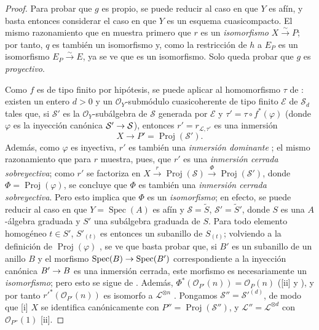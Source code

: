 \documentclass[oneside,10pt]{amsart}
\makeatletter
\newcommand{\ega@arrow}[2]{\mathchoice{#1}{#2}{#2}{#2}}
\renewcommand{\to}{\ega@arrow{\longrightarrow}{\rightarrow}}
\newcommand{\oldpage}[2][]{\marginnote{\normalfont\footnotesize\textbf{#1}~|~#2}\ignorespaces}
\makeatother
\begin{document}
\begin{proof}
Para probar que $g$ es propio, se puede reducir al caso en que $Y$ es afín, y basta entonces considerar el caso en que $Y$ es un esquema cuasicompacto.
El mismo razonamiento que en  muestra primero que $r$ es un \emph{isomorfismo} $X\xrightarrow{\sim}P$;
por tanto, $q$ es también un isomorfismo y, como la restricción de $h$ a $E_P$ es un isomorfismo $E_P\xrightarrow{\sim}E$, ya se ve que  es un isomorfismo.
Solo queda probar que $g$ es \emph{proyectivo}.

Como $f$ es de tipo finito por hipótesis, se puede aplicar  al homomorfismo
\oldpage[II]{180}
$\tau$ de :
existen un entero $d>0$ y un $\mathcal{O}_Y$-submódulo cuasicoherente de tipo finito $\mathcal{E}$ de $\mathcal{S}_d$ tales que, si $\mathcal{S}'$ es la $\mathcal{O}_Y$-subálgebra de $\mathcal{S}$ generada por $\mathcal{E}$ y $\tau'=\tau\circ f^*(\varphi)$ (donde $\varphi$ es la inyección canónica $\mathcal{S}'\to\mathcal{S}$), entonces $r'=r_{\mathcal{L},\tau'}$ es una inmersión
\[
  X\longrightarrow P'=\operatorname{Proj}(\mathcal{S}').
\]
Además, como $\varphi$ es inyectiva, $r'$ es también una \emph{inmersión dominante} ;
el mismo razonamiento que para $r$ muestra, pues, que $r'$ es una \emph{inmersión cerrada sobreyectiva};
como $r'$ se factoriza en $X\xrightarrow{r}\operatorname{Proj}(\mathcal{S})
\xrightarrow{\Phi}\operatorname{Proj}(\mathcal{S}')$, donde $\Phi=\operatorname{Proj}(\varphi)$, se concluye que $\Phi$ es también una \emph{inmersión cerrada sobreyectiva}.
Pero esto implica que $\Phi$ es un \emph{isomorfismo};
en efecto, se puede reducir al caso en que $Y=\operatorname{Spec}(A)$ es afín y $\mathcal{S}=\widetilde{S}$, $\mathcal{S}'=\widetilde{S}'$, donde $S$ es una $A$-álgebra graduada y $S'$ una subálgebra graduada de $S$.
Para todo elemento homogéneo $t\in S'$, $S'_{(t)}$ es entonces un subanillo de $S_{(t)}$;
volviendo a la definición de $\operatorname{Proj}(\varphi)$ , se ve que basta probar que, si $B'$ es un subanillo de un anillo $B$ y el morfismo $\operatorname{Spec}(B)\to\operatorname{Spec}(B')$ correspondiente a la inyección canónica $B'\to B$ es una inmersión cerrada, este morfismo es necesariamente un \emph{isomorfismo};
pero esto se sigue de .
Además, $\Phi^*(\mathcal{O}_{P'}(n))=\mathcal{O}_P(n)$ ([ii] y ), y por tanto $r'^*(\mathcal{O}_{P'}(n))$ es isomorfo a $\mathcal{L}^{\otimes n}$ .
Pongamos $\mathcal{S}''=\mathcal{S}'^{(d)}$, de modo que [i] $X$ se identifica canónicamente con $P''=\operatorname{Proj}(\mathcal{S}'')$, y $\mathcal{L}''=\mathcal{L}^{\otimes d}$ con $\mathcal{O}_{P''}(1)$ [ii].


\end{proof}
\end{document}

